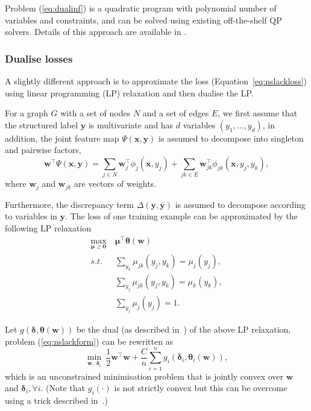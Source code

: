 \documentclass[9pt]{extarticle}
\begin{document}
Problem (\ref{eq:dualinf}) is a quadratic program with polynomial number of variables and constraints, 
and can be solved using existing off-the-shelf QP solvers.
Details of this approach are available in \cite{taskar2005learning}.


\subsubsection{Dualise losses}
\label{sec:dualloss}

A slightly different approach is to approximate the loss (Equation~\ref{eq:nslackloss}) using linear programming (LP) relaxation and 
then dualise the LP. 

For a graph $G$ with a set of nodes $N$ and a set of edges $E$, 
we first assume that the structured label $\mathbf{y}$ is multivariate and has $d$ variables $(y_1, \dots, y_d)$,
in addition, the joint feature map $\Psi(\mathbf{x}, \mathbf{y})$ is assumed to decompose into singleton and pairwise factors,
\begin{equation*}
\mathbf{w}^\top \Psi(\mathbf{x}, \mathbf{y}) = 
\sum_{j \in N} \mathbf{w}_j^\top \phi_j(\mathbf{x}, y_j) + \sum_{jk \in E} \mathbf{w}_{jk}^\top \phi_{jk}(\mathbf{x}, y_j, y_k),
\end{equation*}
where $\mathbf{w}_j$ and $\mathbf{w}_{jk}$ are vectors of weights.

Furthermore, the discrepancy term $\Delta(\mathbf{y}, \bar{\mathbf{y}})$ is assumed to decompose according to variables in $\mathbf{y}$.
The loss of one training example can be approximated by the following LP relaxation
\begin{equation*}
\begin{aligned}
\max_{\bm{\mu} \ge \mathbf{0}} ~& \bm{\mu}^\top \bm{\theta}(\mathbf{w}) \\
s.t.~~ ~& \sum_{y_k} \mu_{jk}(y_j, y_k) = \mu_j(y_j), \\
        & \sum_{y_j} \mu_{jk}(y_j, y_k) = \mu_k(y_k), \\
        & \sum_{y_j} \mu_j(y_j) = 1.
\end{aligned}
\end{equation*}

Let $g(\bm{\delta}, \bm{\theta}(\mathbf{w}))$ be the dual (as described in~\cite{werner2007linear}) of the above LP relaxation,
problem (\ref{eq:nslackform}) can be rewritten as
\begin{equation*}
\min_{\mathbf{w}, ~\bm{\delta}_i} ~\frac{1}{2} \mathbf{w}^\top \mathbf{w} + \frac{C}{n} \sum_{i=1}^n g_i(\bm{\delta}_i, \bm{\theta}_i(\mathbf{w})),
\end{equation*}
which is an unconstrained minimisation problem that is jointly convex over $\mathbf{w}$ and $\bm{\delta}_i,\forall i$.
(Note that $g_i(\cdot)$ is not strictly convex but this can be overcome using a trick described in~\cite{meshi2010learning}.)
\end{document}
